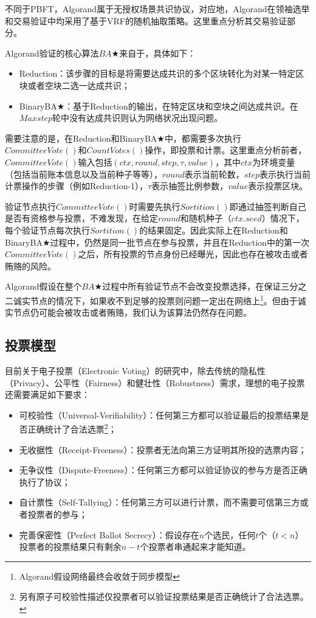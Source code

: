 不同于PBFT，Algorand\cite{gilad2017algorand}属于无授权场景共识协议，对应地，Algorand在领袖选举和交易验证中均采用了基于VRF的随机抽取策略。这里重点分析其交易验证部分。

Algorand验证的核心算法$BA\bigstar$来自于\cite{miller2016honey}，具体如下：
\begin{itemize}
	\item Reduction：该步骤的目标是将需要达成共识的多个区块转化为对某一特定区块或者空块二选一达成共识；
	\item BinaryBA$\bigstar$：基于Reduction的输出，在特定区块和空块之间达成共识。在$Maxstep$轮中没有达成共识则认为网络状况出现问题。
\end{itemize}

需要注意的是，在Reduction和BinaryBA$\bigstar$中，都需要多次执行$CommitteeVote()$和$CountVotes()$操作，即投票和计票。这里重点分析前者，$CommitteeVote()$输入包括$(ctx,round,step,\tau,value)$，其中$ctx$为环境变量（包括当前账本信息以及当前种子等等），$round$表示当前轮数，$step$表示执行当前计票操作的步骤（例如Reduction-1），$\tau$表示抽签比例参数，$value$表示投票区块。

验证节点执行$CommitteeVote()$时需要先执行$Sortition()$即通过抽签判断自己是否有资格参与投票，不难发现，在给定$round$和随机种子（$ctx.seed$）情况下，每个验证节点每次执行$Sortition()$的结果固定。因此实际上在Reduction和BinaryBA$\bigstar$过程中，仍然是同一批节点在参与投票，并且在Reduction中的第一次$CommitteeVote()$之后，所有投票的节点身份已经曝光，因此也存在被攻击或者贿赂的风险。

Algorand假设在整个$BA\bigstar$过程中所有验证节点不会改变投票选择，在保证三分之二诚实节点的情况下，如果收不到足够的投票则问题一定出在网络上\footnote{Algorand假设网络最终会收敛于同步模型}。但由于诚实节点仍可能会被攻击或者贿赂，我们认为该算法仍然存在问题。


\subsection{投票模型}
目前关于电子投票（Electronic Voting）的研究中\cite{kiayias2002self}，除去传统的隐私性（Privacy）、公平性（Fairness）和健壮性（Robustness）需求，理想的电子投票还需要满足如下要求：
\begin{itemize}
	\item 可校验性（Universal-Verifiability）：任何第三方都可以验证最后的投票结果是否正确统计了合法选票\footnote{另有原子可校验性描述仅投票者可以验证投票结果是否正确统计了合法选票。}；
	\item 无收据性（Receipt-Freeness）：投票者无法向第三方证明其所投的选票内容；
	\item 无争议性（Dispute-Freeness）：任何第三方都可以验证协议的参与方是否正确执行了协议；
	\item 自计票性（Self-Tallying）：任何第三方可以进行计票，而不需要可信第三方或者投票者的参与；
	\item 完善保密性（Perfect Ballot Secrecy）：假设存在$n$个选民，任何$t$个（$t<n$）投票者的投票结果只有剩余$n-t$个投票者串通起来才能知道。
\end{itemize}

